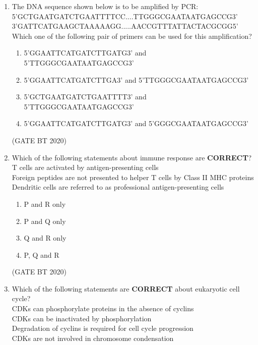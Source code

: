 \documentclass[journal,12pt,onecolumn]{IEEEtran}
\theoremstyle{remark}
\begin{document}
\begin{enumerate}[label=Q\arabic*:, start=26, leftmargin=2em]
\item The DNA sequence shown below is to be amplified by PCR:\\
5'GCTGAATGATCTGAATTTTCC....TTGGGCGAATAATGAGCCG3'\\
3'GATTCATGAAGCTAAAAAGG.....AACCGTTTATTACTACGCGG5'\\
Which one of the following pair of primers can be used for this amplification?
\begin{enumerate}[label=\alph*)]
\item 5'GGAATTCATGATCTTGATG3' and 5'TTGGGCGAATAATGAGCCG3'
\item 5'GGAATTCATGATCTTGA3' and 5'TTGGGCGAATAATGAGCCG3'
\item 5'GCTGAATGATCTGAATTTT3' and 5'TTGGGCGAATAATGAGCCG3'
\item 5'GGAATTCATGATCTTGATG3' and 5'GGGCGAATAATGAGCCG3'
\end{enumerate}
\hfill(GATE BT 2020)


\item Which of the following statements about immune response are \textbf{CORRECT}?\\
 T cells are activated by antigen-presenting cells\\
 Foreign peptides are not presented to helper T cells by Class II MHC proteins\\
 Dendritic cells are referred to as professional antigen-presenting cells
\begin{multicols}{2}
\begin{enumerate}[label=\alph*)]
\item P and R only
\item P and Q only
\item Q and R only
\item P, Q and R
\end{enumerate}
\end{multicols}
\hfill(GATE BT 2020)

\item Which of the following statements are \textbf{CORRECT} about eukaryotic cell cycle?\\
 CDKs can phosphorylate proteins in the absence of cyclins\\
 CDKs can be inactivated by phosphorylation\\
Degradation of cyclins is required for cell cycle progression\\
CDKs are not involved in chromosome condensation

\begin{multicols}{2}
\begin{enumerate}[label=\alph*)]


\end{enumerate}
\end{multicols}
\end{enumerate}
\end{document}
